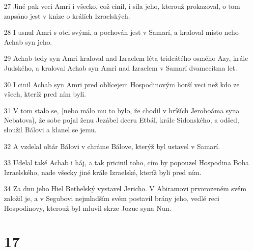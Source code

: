 \par 27 Jiné pak veci Amri i všecko, což cinil, i síla jeho, kterouž prokazoval, o tom zapsáno jest v knize o králích Izraelských.
\par 28 I usnul Amri s otci svými, a pochován jest v Samarí, a kraloval místo neho Achab syn jeho.
\par 29 Achab tedy syn Amri kraloval nad Izraelem léta tridcátého osmého Azy, krále Judského, a kraloval Achab syn Amri nad Izraelem v Samarí dvamecítma let.
\par 30 I cinil Achab syn Amri pred oblícejem Hospodinovým horší veci než kdo ze všech, kteríž pred ním byli.
\par 31 V tom stalo se, (nebo málo mu to bylo, že chodil v hríších Jeroboáma syna Nebatova), že sobe pojal ženu Jezábel dceru Etbál, krále Sidonského, a odšed, sloužil Bálovi a klanel se jemu.
\par 32 A vzdelal oltár Bálovi v chráme Bálove, kterýž byl ustavel v Samarí.
\par 33 Udelal také Achab i háj, a tak pricinil toho, cím by popouzel Hospodina Boha Izraelského, nade všecky jiné krále Izraelské, kteríž byli pred ním.
\par 34 Za dnu jeho Hiel Bethelský vystavel Jericho. V Abiramovi prvorozeném svém založil je, a v Segubovi nejmladším svém postavil brány jeho, vedlé reci Hospodinovy, kterouž byl mluvil skrze Jozue syna Nun.

\chapter{17}

